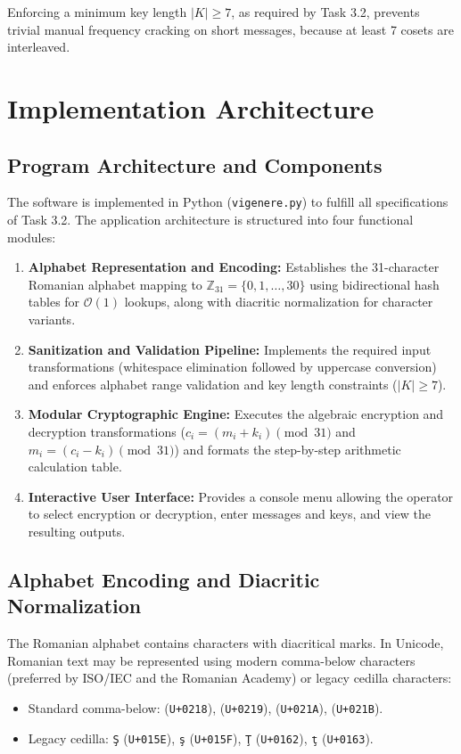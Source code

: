 \documentclass[11pt,a4paper]{article}
\begin{document}
Enforcing a minimum key length $|K| \ge 7$, as required by Task 3.2, prevents trivial manual frequency cracking on short messages, because at least 7 cosets are interleaved.

\newpage
\section{Implementation Architecture}

\subsection{Program Architecture and Components}

The software is implemented in Python (\texttt{vigenere.py}) to fulfill all specifications of Task 3.2. The application architecture is structured into four functional modules:
\begin{enumerate}
  \item \textbf{Alphabet Representation and Encoding:} Establishes the 31-character Romanian alphabet mapping to $\mathbb{Z}_{31} = \{0, 1, \dots, 30\}$ using bidirectional hash tables for $\mathcal{O}(1)$ lookups, along with diacritic normalization for character variants.
  \item \textbf{Sanitization and Validation Pipeline:} Implements the required input transformations (whitespace elimination followed by uppercase conversion) and enforces alphabet range validation and key length constraints ($|K| \ge 7$).
  \item \textbf{Modular Cryptographic Engine:} Executes the algebraic encryption and decryption transformations ($c_i = (m_i + k_i) \pmod{31}$ and $m_i = (c_i - k_i) \pmod{31}$) and formats the step-by-step arithmetic calculation table.
  \item \textbf{Interactive User Interface:} Provides a console menu allowing the operator to select encryption or decryption, enter messages and keys, and view the resulting outputs.
\end{enumerate}

\subsection{Alphabet Encoding and Diacritic Normalization}

The Romanian alphabet contains characters with diacritical marks. In Unicode, Romanian text may be represented using modern comma-below characters (preferred by ISO/IEC and the Romanian Academy) or legacy cedilla characters:
\begin{itemize}
  \item Standard comma-below: \texttt{} (\texttt{U+0218}), \texttt{} (\texttt{U+0219}), \texttt{} (\texttt{U+021A}), \texttt{} (\texttt{U+021B}).
  \item Legacy cedilla: \texttt{\c{S}} (\texttt{U+015E}), \texttt{\c{s}} (\texttt{U+015F}), \texttt{\c{T}} (\texttt{U+0162}), \texttt{\c{t}} (\texttt{U+0163}).
\end{itemize}
\end{document}
